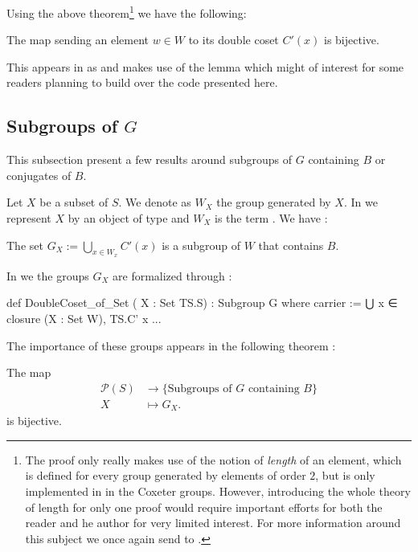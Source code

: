 Using the above theorem\footnote{The proof only really makes use of the notion of \emph{length} of an element, which is defined for every group generated by elements of order $2$, but is only implemented in \Lean in the Coxeter groups. However, introducing the whole theory of length for only one proof would require  important efforts for both the reader and he author for very limited interest. For more information around this subject we once again send to \cite{bourbaki_groupes_2007}.} we have the following: 

\begin{lemme}
    The map sending an element $w \in W$ to its double coset $C'\left( x \right)$ is bijective.
\end{lemme}

This appears in \Lean as  and makes use of the lemma  which might of interest for some readers planning to build over the code presented here.

\subsection{Subgroups of $G$}

This subsection present a few results around subgroups of $G$ containing $B$ or conjugates of $B$.

Let $X$ be a subset of $S$. We denote as $W_X$ the group generated by $X$. In \Lean  we represent $X$ by an object  of type  and $W_X$ is the term . We have :
\begin{theoreme} 
    The set $G_X := \bigcup_{x \in W_x} C'\left( x \right)$ is a subgroup of $W$ that contains $B$.
\end{theoreme}

In \Lean we the groups $G_X$ are formalized through :

\begin{leancode}
def DoubleCoset_of_Set ( X : Set TS.S) : Subgroup G where
  carrier := ⋃ x ∈ closure (X : Set W), TS.C' x
  ...
\end{leancode}

The importance of these groups appears in the following theorem :

\begin{theoreme} \label{thm:GX}
     
    The map \vspace{-0.2cm}
\begin{align*}
\mathcal{P}\left( S \right) &\longrightarrow \{\text{Subgroups of $G$ containing $B$}\} \\
X &\longmapsto G_X 
.\end{align*}
    is bijective. 
\end{theoreme}

